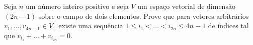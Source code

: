 Seja \(n\) um número inteiro positivo e seja \(V\) um espaço vetorial de dimensão \((2n-1)\) sobre o campo de dois elementos. Prove que para vetores arbitrários \(v_1,\dots,v_{4n-1} \in V,\) existe uma sequência \(1\leq i_1<\dots<i_{2n}\leq 4n-1\) de índices tal que \(v_{i_1}+\dots+v_{i_{2n}}=0.\)
